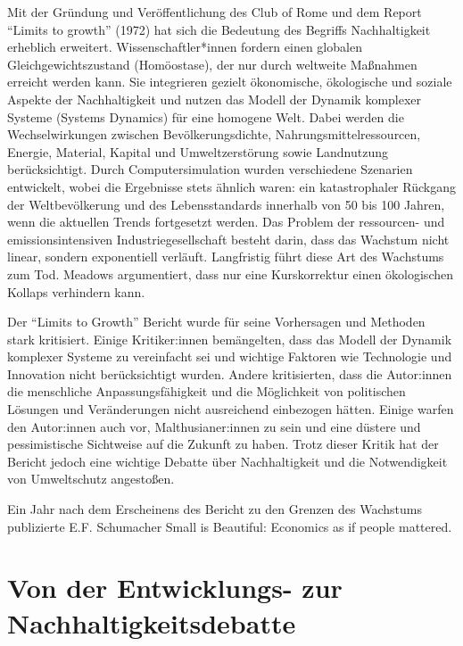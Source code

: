 \documentclass[
]{book}
\begin{document}
Mit der Gründung und Veröffentlichung des Club of Rome und dem Report ``Limits to growth'' (1972) hat sich die Bedeutung des Begriffs Nachhaltigkeit erheblich erweitert. Wissenschaftler*innen fordern einen globalen Gleichgewichtszustand (Homöostase), der nur durch weltweite Maßnahmen erreicht werden kann. Sie integrieren gezielt ökonomische, ökologische und soziale Aspekte der Nachhaltigkeit und nutzen das Modell der Dynamik komplexer Systeme (Systems Dynamics) für eine homogene Welt. Dabei werden die Wechselwirkungen zwischen Bevölkerungsdichte, Nahrungsmittelressourcen, Energie, Material, Kapital und Umweltzerstörung sowie Landnutzung berücksichtigt. Durch Computersimulation wurden verschiedene Szenarien entwickelt, wobei die Ergebnisse stets ähnlich waren: ein katastrophaler Rückgang der Weltbevölkerung und des Lebensstandards innerhalb von 50 bis 100 Jahren, wenn die aktuellen Trends fortgesetzt werden. Das Problem der ressourcen- und emissionsintensiven Industriegesellschaft besteht darin, dass das Wachstum nicht linear, sondern exponentiell verläuft. Langfristig führt diese Art des Wachstums zum Tod. Meadows argumentiert, dass nur eine Kurskorrektur einen ökologischen Kollaps verhindern kann.

Der ``Limits to Growth'' Bericht wurde für seine Vorhersagen und Methoden stark kritisiert. Einige Kritiker:innen bemängelten, dass das Modell der Dynamik komplexer Systeme zu vereinfacht sei und wichtige Faktoren wie Technologie und Innovation nicht berücksichtigt wurden. Andere kritisierten, dass die Autor:innen die menschliche Anpassungsfähigkeit und die Möglichkeit von politischen Lösungen und Veränderungen nicht ausreichend einbezogen hätten. Einige warfen den Autor:innen auch vor, Malthusianer:innen zu sein und eine düstere und pessimistische Sichtweise auf die Zukunft zu haben. Trotz dieser Kritik hat der Bericht jedoch eine wichtige Debatte über Nachhaltigkeit und die Notwendigkeit von Umweltschutz angestoßen.

Ein Jahr nach dem Erscheinens des Bericht zu den Grenzen des Wachstums publizierte E.F. Schumacher Small is Beautiful: Economics as if people mattered.

\hypertarget{von-der-entwicklungs--zur-nachhaltigkeitsdebatte}{%
\section{Von der Entwicklungs- zur Nachhaltigkeitsdebatte}\label{von-der-entwicklungs--zur-nachhaltigkeitsdebatte}}
\end{document}
